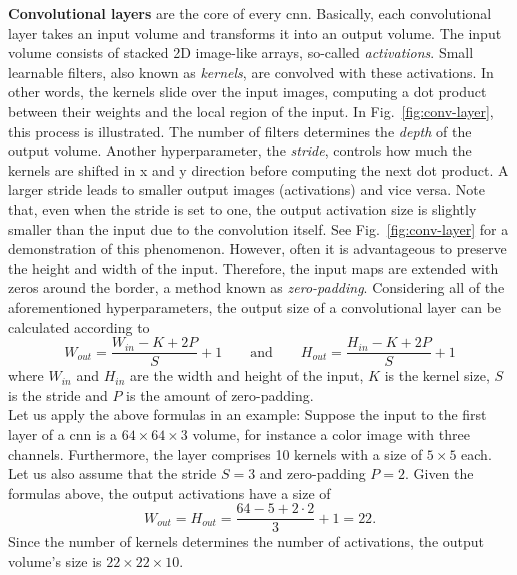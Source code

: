 \textbf{Convolutional layers} are the core of every \gls{cnn}. Basically, each convolutional layer takes an input volume and transforms it into an output volume. The input volume consists of stacked 2D image-like arrays, so-called \textit{activations}. Small learnable filters, also known as \textit{kernels}, are convolved with these activations. In other words, the kernels slide over the input images, computing a dot product between their weights and the local region of the input. In Fig.~\ref{fig:conv-layer}, this process is illustrated. The number of filters determines the \textit{depth} of the output volume. Another hyperparameter, the \textit{stride}, controls how much the kernels are shifted in x and y direction before computing the next dot product. A larger stride leads to smaller output images (activations) and vice versa. Note that, even when the stride is set to one, the output activation size is slightly smaller than the input due to the convolution itself. See Fig.~\ref{fig:conv-layer} for a demonstration of this phenomenon. However, often it is advantageous to preserve the height and width of the input. Therefore, the input maps are extended with zeros around the border, a method known as \textit{zero-padding}. Considering all of the aforementioned hyperparameters, the output size of a convolutional layer can be calculated according to
\begin{equation*}
	W_{out} = \frac{W_{in} - K + 2P}{S} + 1 \qquad \text{and} \qquad H_{out} = \frac{H_{in} - K + 2P}{S} + 1
\end{equation*}
where $W_{in}$ and $H_{in}$ are the width and height of the input, $K$ is the kernel size, $S$ is the stride and $P$ is the amount of zero-padding.\\

Let us apply the above formulas in an example: Suppose the input to the first layer of a \gls{cnn} is a $64 \times 64 \times 3$ volume, for instance a color image with three channels. Furthermore, the layer comprises 10 kernels with a size of $5 \times 5$ each. Let us also assume that the stride $S=3$ and zero-padding $P=2$. Given the formulas above, the output activations have a size of 
\begin{equation*}
W_{out} = H_{out} =\frac{64 - 5 + 2 \cdot 2}{3} + 1 = 22.
\end{equation*}
Since the number of kernels determines the number of activations, the output volume's size is $22 \times 22 \times 10$.\\

